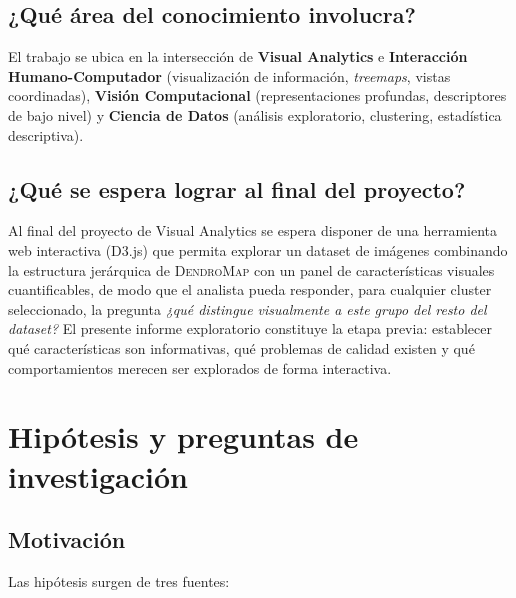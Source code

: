 \documentclass[11pt,a4paper]{article}
\begin{document}
\subsection*{¿Qué área del conocimiento involucra?}

El trabajo se ubica en la intersección de \textbf{Visual Analytics} e
\textbf{Interacción Humano-Computador} (visualización de información,
\emph{treemaps}, vistas coordinadas), \textbf{Visión Computacional}
(representaciones profundas, descriptores de bajo nivel) y \textbf{Ciencia de
Datos} (análisis exploratorio, clustering, estadística descriptiva).

\subsection*{¿Qué se espera lograr al final del proyecto?}

Al final del proyecto de Visual Analytics se espera disponer de una herramienta
web interactiva (D3.js) que permita explorar un dataset de imágenes combinando
la estructura jerárquica de \textsc{DendroMap} con un panel de características
visuales cuantificables, de modo que el analista pueda responder, para cualquier
cluster seleccionado, la pregunta \emph{¿qué distingue visualmente a este grupo
del resto del dataset?} El presente informe exploratorio constituye la etapa
previa: establecer qué características son informativas, qué problemas de
calidad existen y qué comportamientos merecen ser explorados de forma
interactiva.

\section{Hipótesis y preguntas de investigación}

\subsection{Motivación}

Las hipótesis surgen de tres fuentes:
\end{document}
